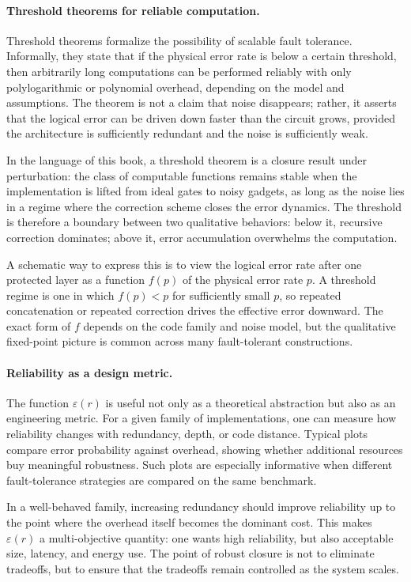 \documentclass[11pt]{article}
\begin{document}
\paragraph{Threshold theorems for reliable computation.}
Threshold theorems formalize the possibility of scalable fault tolerance. Informally, they state that if the physical error rate is below a certain threshold, then arbitrarily long computations can be performed reliably with only polylogarithmic or polynomial overhead, depending on the model and assumptions. The theorem is not a claim that noise disappears; rather, it asserts that the logical error can be driven down faster than the circuit grows, provided the architecture is sufficiently redundant and the noise is sufficiently weak.

In the language of this book, a threshold theorem is a closure result under perturbation: the class of computable functions remains stable when the implementation is lifted from ideal gates to noisy gadgets, as long as the noise lies in a regime where the correction scheme closes the error dynamics. The threshold is therefore a boundary between two qualitative behaviors: below it, recursive correction dominates; above it, error accumulation overwhelms the computation.

A schematic way to express this is to view the logical error rate after one protected layer as a function \(f(p)\) of the physical error rate \(p\). A threshold regime is one in which \(f(p) < p\) for sufficiently small \(p\), so repeated concatenation or repeated correction drives the effective error downward. The exact form of \(f\) depends on the code family and noise model, but the qualitative fixed-point picture is common across many fault-tolerant constructions.

\paragraph{Reliability as a design metric.}
The function \(\varepsilon(r)\) is useful not only as a theoretical abstraction but also as an engineering metric. For a given family of implementations, one can measure how reliability changes with redundancy, depth, or code distance. Typical plots compare error probability against overhead, showing whether additional resources buy meaningful robustness. Such plots are especially informative when different fault-tolerance strategies are compared on the same benchmark.

In a well-behaved family, increasing redundancy should improve reliability up to the point where the overhead itself becomes the dominant cost. This makes \(\varepsilon(r)\) a multi-objective quantity: one wants high reliability, but also acceptable size, latency, and energy use. The point of robust closure is not to eliminate tradeoffs, but to ensure that the tradeoffs remain controlled as the system scales.
\end{document}
